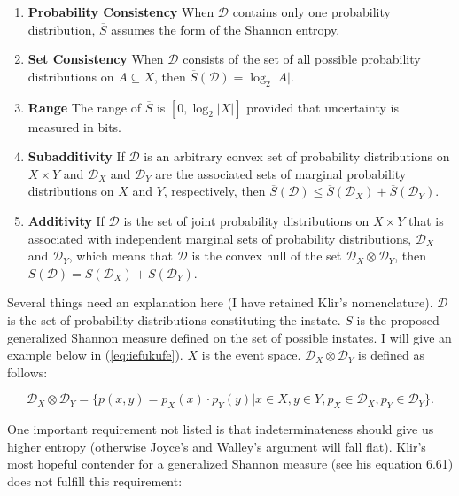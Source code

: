 \documentclass[phd,12pt,oneside]{ubcthesis}
\begin{document}
\begin{enumerate}[(S1)]
\item \textbf{Probability Consistency} When $\mathcal{D}$ contains
  only one probability distribution, $\overline{S}$ assumes the form of
  the Shannon entropy.
\item \textbf{Set Consistency} When $\mathcal{D}$ consists of the set
  of all possible probability distributions on $A\subseteq{}X$, then
  $\overline{S}(\mathcal{D})=\log_{2}|A|$.
\item \textbf{Range} The range of $\overline{S}$ is $[0,\log_{2}|X|]$
  provided that uncertainty is measured in bits.
\item \textbf{Subadditivity} If $\mathcal{D}$ is an arbitrary convex
  set of probability distributions on $X\times{}Y$ and
  $\mathcal{D}_{X}$ and $\mathcal{D}_{Y}$ are the associated sets of
  marginal probability distributions on $X$ and $Y$, respectively,
  then
  $\overline{S}(\mathcal{D})\leq\overline{S}(\mathcal{D}_{X})+\overline{S}(\mathcal{D}_{Y})$.
\item \textbf{Additivity} If $\mathcal{D}$ is the set of joint
  probability distributions on $X\times{}Y$ that is associated with
  independent marginal sets of probability distributions,
  $\mathcal{D}_{X}$ and $\mathcal{D}_{Y}$, which means that
  $\mathcal{D}$ is the convex hull of the set
  $\mathcal{D}_{X}\otimes\mathcal{D}_{Y}$, then
  $\overline{S}(\mathcal{D})=\overline{S}(\mathcal{D}_{X})+\overline{S}(\mathcal{D}_{Y})$.
\end{enumerate}

Several things need an explanation here (I have retained Klir's
nomenclature). $\mathcal{D}$ is the set of probability distributions
constituting the instate. $\overline{S}$ is the proposed generalized
Shannon measure defined on the set of possible instates. I will give
an example below in (\ref{eq:iefukufe}). $X$ is the event space.
$\mathcal{D}_{X}\otimes\mathcal{D}_{Y}$ is defined as follows:

\begin{equation}
  \label{eq:xoofahee}
\mathcal{D}_{X}\otimes\mathcal{D}_{Y}=\{p(x,y)=p_{X}(x)\cdot{}p_{Y}(y)|x\in{}X,y\in{}Y,p_{X}\in\mathcal{D}_{X},p_{Y}\in\mathcal{D}_{Y}\}.
\end{equation}

One important requirement not listed is that indeterminateness should
give us higher entropy (otherwise Joyce's and Walley's argument will
fall flat). Klir's most hopeful contender for a generalized Shannon
measure (see his equation 6.61) does not fulfill this requirement:
\end{document}
